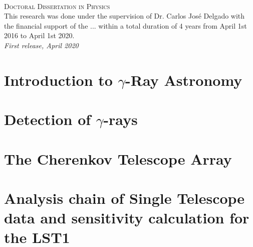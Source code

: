 \documentclass[12pt,fleqn,aas_macros]{book} %
\begin{document}
\newpage
~\vfill
\thispagestyle{empty}


\noindent \textsc{Doctoral Dissertation in Physics}\\

\noindent This research was done under the supervision of Dr. Carlos José Delgado with the financial support of the ... within a total duration of 4 years from April 1st 2016 to April 1st 2020.\\ %

\noindent \textit{First release, April 2020} %
\fi


\pagestyle{empty} %

\tableofcontents %


\pagestyle{fancy} %



\chapter{Introduction to $\gamma$-Ray Astronomy}



\chapter{Detection of $\gamma$-rays}



\chapter{The Cherenkov Telescope Array} \label{cap:CTA}


\chapter[Analysis chain of Single Telescope data and...]{Analysis chain of Single Telescope data and sensitivity calculation for the LST1} \label{cap:LST1}



\printbibliography
\printglossaries
\end{document}
